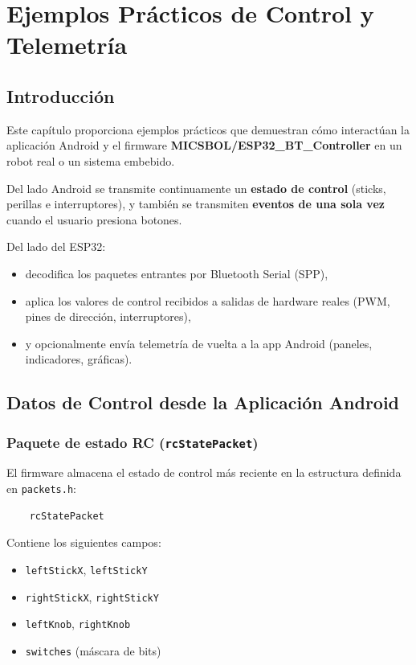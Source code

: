 \chapter{Ejemplos Prácticos de Control y Telemetría}
\label{ch:practical-examples}

\section{Introducción}
\label{sec:practical-intro}

Este capítulo proporciona ejemplos prácticos que demuestran cómo interactúan la aplicación Android
y el firmware \textbf{MICSBOL/ESP32\_BT\_Controller} en un robot real o un sistema embebido.

Del lado Android se transmite continuamente un \textbf{estado de control} (sticks, perillas e interruptores),
y también se transmiten \textbf{eventos de una sola vez} cuando el usuario presiona botones.

Del lado del ESP32:
\begin{itemize}
    \item decodifica los paquetes entrantes por Bluetooth Serial (SPP),
    \item aplica los valores de control recibidos a salidas de hardware reales (PWM, pines de dirección, interruptores),
    \item y opcionalmente envía telemetría de vuelta a la app Android (paneles, indicadores, gráficas).
\end{itemize}

\section{Datos de Control desde la Aplicación Android}
\label{sec:control-data}

\subsection{Paquete de estado RC (\texttt{rcStatePacket})}
El firmware almacena el estado de control más reciente en la estructura definida en \texttt{packets.h}:

\begin{verbatim}
    rcStatePacket
\end{verbatim}

Contiene los siguientes campos:

\begin{itemize}
    \item \texttt{leftStickX}, \texttt{leftStickY}
    \item \texttt{rightStickX}, \texttt{rightStickY}
    \item \texttt{leftKnob}, \texttt{rightKnob}
    \item \texttt{switches} (máscara de bits)
\end{itemize}

